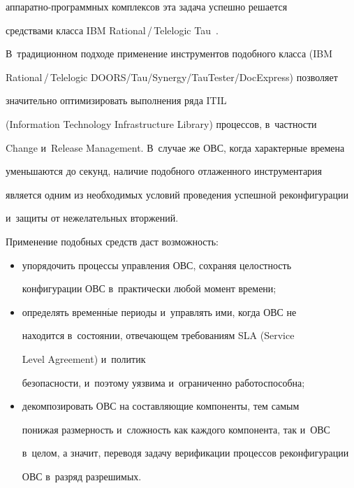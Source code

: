 ап\-па\-рат\-но-про\-грам\-мных комплексов эта задача успешно решается 


средствами класса IBM Rational\,/\,Telelogic Tau~\cite{14-g7, 15-g7}. 


В~традиционном подходе применение инструментов подобного класса (IBM 


Rational\,/\,Telelogic DOORS/Tau/Synergy/TauTester/DocExpress) позволяет 


значительно оптимизировать выполнения ряда ITIL


(Information Technology Infrastructure Library) про\-цес\-сов, в~частности 


Change и~Release Management. В~случае же ОВС, когда характерные времена 


уменьшаются до секунд, наличие подобного отлаженного инструментария 


является одним из необходимых условий проведения успешной реконфигурации 


и~защиты от нежелательных вторжений. 


   


   Применение подобных средств даст возможность:


   \begin{itemize}


\item упорядочить процессы управления ОВС, сохраняя целостность 


конфигурации ОВС в~практически любой момент времени; 


\item определять временн$\acute{\mbox{ы}}$е периоды и~управлять ими, когда ОВС не 


находится в~состоянии, отвечающем требованиям SLA (Service


Level Agreement) и~политик 


безопасности, и~поэтому уязвима и~ограниченно работо\-спо\-собна;


{





}





\item декомпозировать ОВС на составляющие компоненты, тем самым 


понижая размерность и~сложность как каждого компонента, так и~ОВС 


в~целом, а значит, переводя задачу верификации процессов реконфигурации 


ОВС в~разряд разрешимых. 


\end{itemize}






